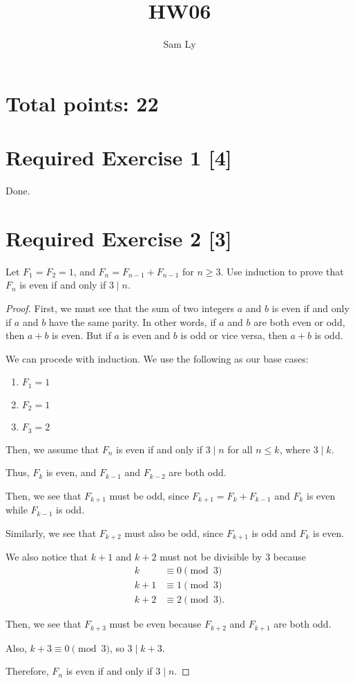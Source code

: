 \documentclass{article}
\title{HW06}
\author{Sam Ly}
\begin{document}
\maketitle
\section*{Total points: 22}
\section*{Required Exercise 1 [4]}

Done.

\section*{Required Exercise 2 [3]}

Let \(F_1 = F_2 = 1\), and \(F_n = F_{n-1} + F_{n-1}\) for \(n \ge 3\). Use 
induction to prove that \(F_n\) is even if and only if \(3 \mid n\).

\begin{proof}
    First, we must see that the sum of two integers \(a\) and \(b\) is even if 
    and only if \(a\) and \(b \) have the same parity. In other words, if \(a\) 
    and \(b\) are both even or odd, then \(a + b\) is even. But if \(a\) is even 
    and \(b\) is odd or vice versa, then \(a + b \) is odd. 

    We can procede with induction. We use the following as our base cases: 
    \begin{enumerate}
        \item \(F_1 = 1\)
        \item \(F_2 = 1\)
        \item \(F_3 = 2\)
    \end{enumerate}

    Then, we assume that \(F_n\) is even if and only if \(3 \mid n\) for all 
    \(n \le k\), where \(3 \mid k\).

    Thus, \(F_k\) is even, and \(F_{k-1}\) and \(F_{k-2}\) are both odd. 

    Then, we see that \(F_{k+1}\) must be odd, since \(F_{k+1} = F_k + F_{k-1}\) 
    and \(F_k\) is even while \(F_{k-1}\) is odd. 

    Similarly, we see that \(F_{k+2}\) must also be odd, since \(F_{k+1}\) is odd 
    and \(F_k\) is even. 

    We also notice that \(k+1\) and \(k+2\) must not be divisible by 3 because
    \begin{align*}
        k &\equiv 0 \pmod3 \\
        k + 1 &\equiv 1 \pmod3\\
        k + 2 &\equiv 2 \pmod3.
    \end{align*}

    Then, we see that \(F_{k+3}\) must be even because \(F_{k+2}\) and \(F_{k+1}\)
    are both odd. 
    
    Also, \(k + 3 \equiv 0 \pmod3\), so \(3 \mid k + 3\).

    Therefore, \(F_n\) is even if and only if \(3 \mid n\). 
\end{proof}
\end{document}
